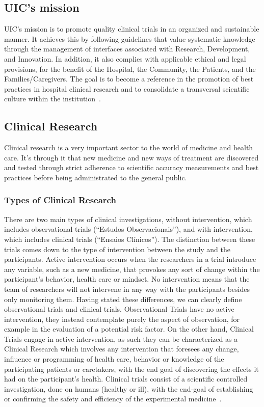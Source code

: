 \subsection{UIC's mission}
UIC's mission is to promote quality clinical trials in an organized and sustainable manner. It achieves this by following guidelines that value systematic knowledge through the management of interfaces associated with Research, Development, and Innovation. In addition, it also complies with applicable ethical and legal provisions, for the benefit of the Hospital, the Community, the Patients, and the Families/Caregivers.
The goal is to become a reference in the promotion of best practices in hospital clinical research and to consolidate a transversal scientific culture within the institution~\cite{hff-uic}.

\subsection{Clinical Research}
Clinical research is a very important sector to the world of medicine and
health care. It's through it that new medicine and new ways of
treatment are discovered and tested through strict adherence to 
scientific accuracy measurements and best practices before being
administrated to the general public. 

\subsubsection{Types of Clinical Research}
There are two main types of clinical investigations, without intervention, which includes observational trials (``Estudos Observacionais''), and with intervention, which includes clinical trials (``Ensaios Clínicos''). The distinction between these trials comes down to the type of intervention between the study and the participants. Active intervention occurs when the researchers in a trial introduce any variable, such as a new medicine, that provokes any sort of change within the participant's behavior, health care or mindset. No intervention means that the team of researchers will not intervene in any way with the participants besides only monitoring them.
Having stated these differences, we can clearly define observational trials and clinical trials.
Observational Trials have no active intervention, they instead contemplate purely the aspect of observation, for example in the evaluation of a potential risk factor. On the other hand, Clinical Trials engage in active intervention, as such they can be characterized as a Clinical Research which involves any intervention that foresees any change, influence or programming of health care, behavior or knowledge of the participating patients or caretakers, with the end goal of discovering the effects it had on the participant's health.
Clinical trials consist of a scientific controlled investigation, done
on humans (healthy or ill), with the end-goal of establishing or confirming the safety and efficiency of the experimental medicine~\cite{tipos-de-ensaios}.  

